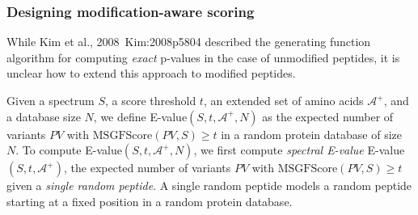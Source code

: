 \subsubsection{Designing modification-aware scoring}
\label{sec:EValue}

While Kim et al., 2008~\cite{unv}{Kim:2008p5804} described the  generating function algorithm for computing {\em exact} p-values in the case of unmodified peptides, it is unclear how to extend this approach to modified peptides. 

Given a spectrum $S$, a score threshold $t$, an extended set of amino acids $\mathcal{A}^+$, and a database size $N$, we define E-value$(S,t,\mathcal{A}^+,N)$ as the expected number of variants  $PV$ 
with $\mathrm{MSGFScore}(PV,S) \geq t$
 in a random protein database of size $N$.
To compute E-value$(S,t,\mathcal{A}^+,N)$, we first compute {\em spectral E-value} E-value$(S,t,\mathcal{A}^+)$, the expected number of variants $PV$ with $\mathrm{MSGFScore}(PV,S) \geq t$ given a {\em single random peptide}.
A single random peptide models a random peptide starting at a fixed position in a random protein database.

